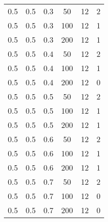 \begin{table}[h]
\begin{center}
\begin{threeparttable}
\begin{tabular}{|c|c|c|c|c|c|}
	0.5 &  0.5 &  0.3 &   50 &    12 &     2 \\
	0.5 &  0.5 &  0.3 &  100 &    12 &     1 \\
	0.5 &  0.5 &  0.3 &  200 &    12 &     1 \\
   \hline
	0.5 &  0.5 &  0.4 &   50 &    12 &     2 \\
	0.5 &  0.5 &  0.4 &  100 &    12 &     1 \\
	0.5 &  0.5 &  0.4 &  200 &    12 &     0 \\
   \hline
	0.5 &  0.5 &  0.5 &   50 &    12 &     2 \\
	0.5 &  0.5 &  0.5 &  100 &    12 &     1 \\
	0.5 &  0.5 &  0.5 &  200 &    12 &     1 \\
   \hline
	0.5 &  0.5 &  0.6 &   50 &    12 &     2 \\
	0.5 &  0.5 &  0.6 &  100 &    12 &     1 \\
	0.5 &  0.5 &  0.6 &  200 &    12 &     1 \\
   \hline
	0.5 &  0.5 &  0.7 &   50 &    12 &     2 \\
	0.5 &  0.5 &  0.7 &  100 &    12 &     0 \\
	0.5 &  0.5 &  0.7 &  200 &    12 &     0 \\
   \hline
    		\end{tabular}
        \end{threeparttable}
	\end{center}
\end{table}
